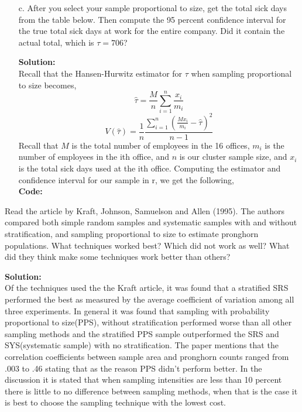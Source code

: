 \documentclass[12pt]{article}
\makeatletter
\theoremstyle{homework}
\newenvironment{exercise}[1]
{\def\@currentlabel{#1}\exercisecore}
{\endexercisecore}
\newcommand{\localhead}[1]{\par\smallskip\noindent\textbf{#1}\nobreak\\}%
\newcommand\solution{\localhead{Solution:}}
\makeatother
\begin{document}
\begin{exercise}{1}
\begin{enumerate}
\item[c.] After you select your sample proportional to size, get the total sick days from the table below. 
Then compute the 95 percent confidence interval for the true total sick days at work for the entire company. 
Did it contain the actual total, which is $\tau = 706$?\\
\solution Recall that the Hansen-Hurwitz estimator for $\tau$ when sampling proportional to size becomes, 
\begin{equation*}
  \hat{\tau} = \dfrac{M}{n} \sum_{i = 1}^n\dfrac{x_i}{m_i}
\end{equation*}
\begin{equation*}
  V(\hat{\tau}) = \dfrac{1}{n}\dfrac{\sum_{i = 1}^n\left(\frac{Mx_i}{m_i} - \hat{\tau}\right)^2}{n-1}
\end{equation*}
Recall that $M$ is the total number of employees in the 16 offices, $m_i$ is the number of employees in the ith office, and 
$n$ is our cluster sample size, and $x_i$ is the total sick days used at the ith office. Computing the estimator and confidence interval for 
our sample in r, we get the following, \\
\textbf{Code:}
\begin{center}
   
\end{center}
\end{enumerate}
\end{exercise}
\vspace{1in}



\begin{exercise}{2} 
  Read the article by Kraft, Johnson, Samuelson and Allen (1995). The authors compared both simple random samples 
  and systematic samples with and without stratification, and sampling proportional to size to estimate pronghorn 
  populations. What techniques worked best? Which did not work as well? What did they think make some techniques 
  work better than others? \\
  \solution Of the techniques used the the Kraft article, it was found that a stratified SRS performed the best as 
  measured by the average coefficient of variation among all three experiments. In general it was found that sampling 
  with probability proportional to size(PPS), without stratification performed worse than all other sampling methods and the 
  stratified PPS sample outperformed the SRS and SYS(systematic sample) with no stratification. The paper mentions that the correlation 
  coefficients between sample area and pronghorn counts ranged from .003 to .46 stating that as the reason PPS didn't perform better. In the
  discussion it is stated that when sampling intensities are less than 10 percent there is little to no difference between sampling methods, when 
  that is the case it is best to choose the sampling technique with the lowest cost. 
\end{exercise}
\end{document}
